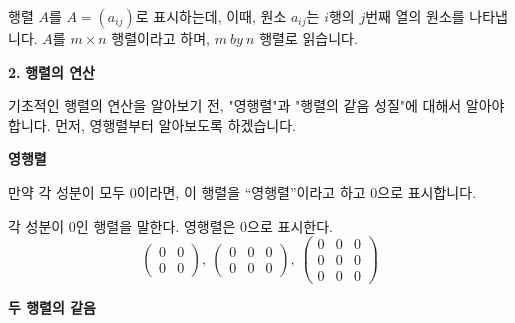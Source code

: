 \begin{flushleft}
행렬 $A$를 $A = (a_{ij})$로 표시하는데, 이때, 원소 $a_{ij}$는 $i$행의 $j$번째 열의 원소를 나타냅니다. $A$를 $m \times n$ 행렬이라고 하며, $m \ by \ n$ 행렬로 읽습니다.
\end{flushleft}

\bigskip
\begin{flushleft}
    {\setmainfont[Path=FONT/]{KOPUBWORLD_DOTUM_PRO_BOLD.OTF} {\textcolor{header}{{\huge\textbf{2.}}}}}
    { {\textcolor{header}{{\huge\textbf{행렬의 연산}}}}}
\end{flushleft}

\begin{flushleft}
    기초적인 행렬의 연산을 알아보기 전, "영행렬"과 "행렬의 같음 성질"에 대해서 알아야 합니다.
    먼저, 영행렬부터 알아보도록 하겠습니다.
\end{flushleft}

\bigskip
\begin{flushleft}
    {\textcolor{subheader}{{\LARGE\textbf{영행렬}}}}
\end{flushleft}

\begin{flushleft}
    만약 각 성분이 모두 0이라면, 이 행렬을 “영행렬”이라고 하고 0으로 표시합니다. 
\end{flushleft}

\begin{tcolorbox}[colback = white, colframe = Definition, title = \textmd{정의: 영행렬}]
    각 성분이 0인 행렬을 말한다. 영행렬은 $0$으로 표시한다.
    \[ \begin{pmatrix} 0 & 0 \\ 0 & 0 \end{pmatrix}, \ 
    \begin{pmatrix} 0 &0 & 0 \\ 0 & 0 & 0 \end{pmatrix}, \ 
    \begin{pmatrix} 0 & 0 & 0 \\ 0 & 0 & 0 \\ 0 & 0 & 0 \end{pmatrix} \]
\end{tcolorbox}

\bigskip
\begin{flushleft}
    {\textcolor{subheader}{{\LARGE\textbf{두 행렬의 같음}}}}
\end{flushleft}

